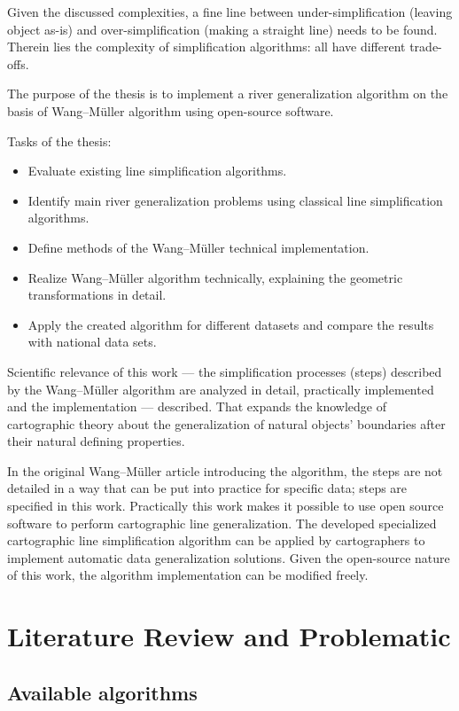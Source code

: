 \documentclass[a4paper]{article}
\newcommand{\WM}{Wang--M{\"u}ller}
\begin{document}
Given the discussed complexities, a fine line between under-simplification
(leaving object as-is) and over-simplification (making a straight line) needs
to be found. Therein lies the complexity of simplification algorithms: all have
different trade-offs.

The purpose of the thesis is to implement a river generalization algorithm
on the basis of {\WM} algorithm using open-source software.

Tasks of the thesis:

\begin{itemize}
    \item Evaluate existing line simplification algorithms.
    \item Identify main river generalization problems using classical line
        simplification algorithms.
    \item Define methods of the {\WM} technical implementation.
    \item Realize {\WM} algorithm technically, explaining the geometric
        transformations in detail.
    \item Apply the created algorithm for different datasets and compare
        the results with national data sets.
\end{itemize}

Scientific relevance of this work --- the simplification processes (steps)
described by the {\WM} algorithm are analyzed in detail, practically
implemented and the implementation --- described. That expands the knowledge of
cartographic theory about the generalization of natural objects' boundaries
after their natural defining properties.

In the original {\WM} article introducing the algorithm, the steps are not
detailed in a way that can be put into practice for specific data; steps are
specified in this work. Practically this work makes it possible to use open
source software to perform cartographic line generalization. The developed
specialized cartographic line simplification algorithm can be applied by
cartographers to implement automatic data generalization solutions. Given the
open-source nature of this work, the algorithm implementation can be modified
freely.

\section{Literature Review and Problematic}
\label{sec:literature-review-problematic}

\subsection{Available algorithms}
\end{document}
